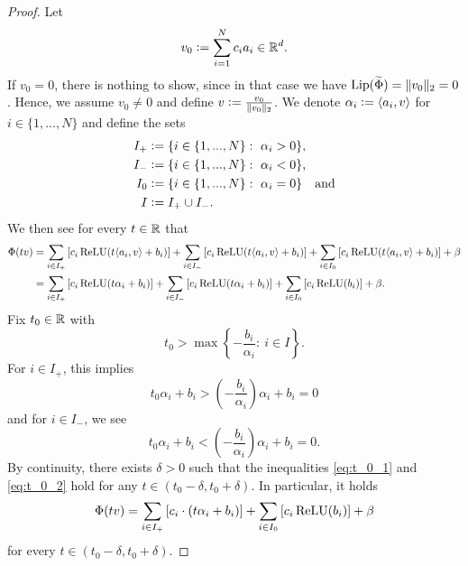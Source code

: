 \begin{proof}
Let 
\begin{equation*}
v_0 \mathrel{\mathop:}= \sum_{i=1}^N c_ia_i \in \mathbb{R}^d.
\end{equation*}
If $v_0 = 0$, there is nothing to show, since in that case we have $\operatorname{Lip}(\widetilde{\Phi}) = \Vert v_0 \Vert_2 = 0$. 
Hence, we assume $v_0 \neq 0$ and define $v \mathrel{\mathop:}= \frac{v_0}{\Vert v_0 \Vert_2}$.
We denote $\alpha_i \mathrel{\mathop:}= \langle a_i, v \rangle$ for $i \in \{1,...,N\}$ and define the sets
\begin{align*}
I_+ &\mathrel{\mathop:}= \{i \in \{1,...,N\}: \ \alpha_i > 0\}, \\
 I_- &\mathrel{\mathop:}= \{i \in \{1,...,N\}: \ \alpha_i < 0\}, \\
  I_0 &\mathrel{\mathop:}= \{i \in \{1,...,N\}: \ \alpha_i = 0\} \quad \text{and} \\ 
I &\mathrel{\mathop:}= I_+ \cup I_-.
\end{align*}
We then see for every $t \in \mathbb{R}$ that 
\begin{align*}
\Phi(tv) &= \sum_{i \in I_+} \left[c_i \operatorname{ReLU}(t \langle a_i, v \rangle + b_i)\right] + \sum_{i \in I_-} \left[c_i \operatorname{ReLU}(t \langle a_i, v \rangle + b_i)\right] + \sum_{i \in I_0} \left[c_i \operatorname{ReLU}(t\langle a_i,v \rangle + b_i)\right] + \beta \\
&= \sum_{i \in I_+} \left[c_i \operatorname{ReLU}(t \alpha_i + b_i)\right] + \sum_{i \in I_-} \left[c_i \operatorname{ReLU}(t \alpha_i + b_i)\right] + \sum_{i \in I_0} \left[c_i \operatorname{ReLU}(b_i)\right] + \beta.
\end{align*}
Fix $t_0 \in \mathbb{R}$ with 
\begin{equation*}
t_0 > \max \left\{-\frac{b_i}{\alpha_i}: \ i \in I\right\}.
\end{equation*}
For $i \in I_+$, this implies
\begin{equation}\label{eq:t_0_1}
t_0\alpha_i + b_i > \left(- \frac{b_i}{\alpha_i}\right) \alpha_i + b_i = 0 
\end{equation}
and for $i \in I_-$, we see
\begin{equation}\label{eq:t_0_2}
t_0\alpha_i + b_i < \left(- \frac{b_i}{\alpha_i}\right) \alpha_i + b_i = 0.
\end{equation}
By continuity, there exists $\delta > 0$ such that the inequalities \eqref{eq:t_0_1} and \eqref{eq:t_0_2} hold for any $t \in (t_0 - \delta, t_0 + \delta)$.
In particular, it holds
\begin{equation*}
\Phi(t v) = \sum_{i \in I_+} \left[c_i\cdot (t \alpha_i + b_i)\right]+\sum_{i \in I_0} \left[c_i \operatorname{ReLU}(b_i)\right] + \beta
\end{equation*}
for every $t \in (t_0 - \delta, t_0 + \delta)$. 

\end{proof}
